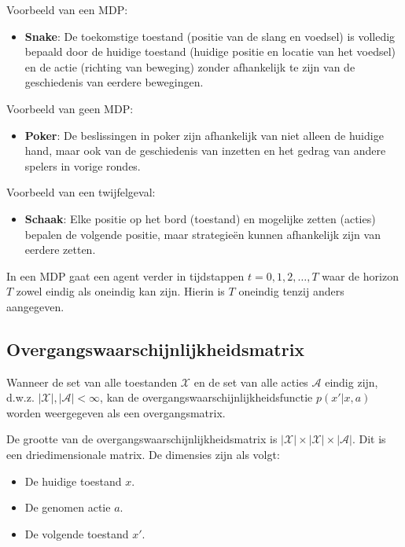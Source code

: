 \documentclass[a4paper,12pt]{report}
\begin{document}
Voorbeeld van een MDP:
\begin{itemize}
    \item \textbf{Snake}: De toekomstige toestand (positie van de slang en voedsel) is volledig bepaald door de huidige toestand (huidige positie en locatie van het voedsel) en de actie (richting van beweging) zonder afhankelijk te zijn van de geschiedenis van eerdere bewegingen.
\end{itemize}

Voorbeeld van geen MDP:
\begin{itemize}
    \item \textbf{Poker}: De beslissingen in poker zijn afhankelijk van niet alleen de huidige hand, maar ook van de geschiedenis van inzetten en het gedrag van andere spelers in vorige rondes.
\end{itemize}

Voorbeeld van een twijfelgeval:
\begin{itemize}
    \item \textbf{Schaak}: Elke positie op het bord (toestand) en mogelijke zetten (acties) bepalen de volgende positie, maar strategieën kunnen afhankelijk zijn van eerdere zetten.
\end{itemize}

In een MDP gaat een agent verder in tijdstappen \(t = 0, 1, 2, \ldots, T\) waar
de horizon \(T\) zowel eindig als oneindig kan zijn. Hierin is \(T\) oneindig
tenzij anders aangegeven.

\subsection*{Overgangswaarschijnlijkheidsmatrix}

Wanneer de set van alle toestanden \(\mathcal{X}\) en de set van alle acties
\(\mathcal{A}\) eindig zijn, d.w.z. \(|\mathcal{X}|, |\mathcal{A}| < \infty\),
kan de overgangswaarschijnlijkheidsfunctie \(p(x'|x,a)\) worden weergegeven als
een overgangsmatrix.

De grootte van de overgangswaarschijnlijkheidsmatrix is \(|\mathcal{X}| \times
|\mathcal{X}| \times |\mathcal{A}|\). Dit is een driedimensionale matrix. De
dimensies zijn als volgt:
\begin{itemize}
    \item De huidige toestand \(x\).
    \item De genomen actie \(a\).
    \item De volgende toestand \(x'\).
\end{itemize}
\end{document}
